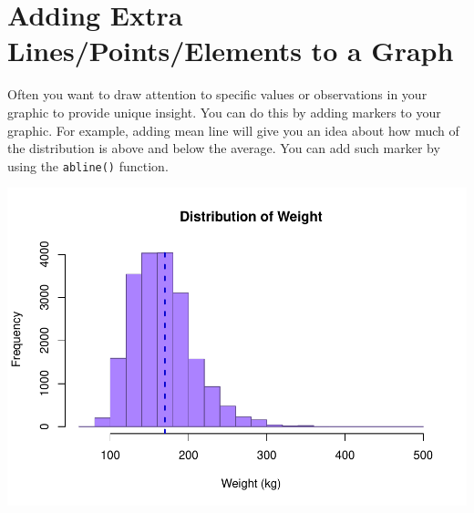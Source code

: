 \documentclass[
]{book}
\newenvironment{Shaded}{\begin{snugshade}}{\end{snugshade}}
\newcommand{\CommentTok}[1]{\textcolor[rgb]{0.56,0.35,0.01}{\textit{#1}}}
\newcommand{\DataTypeTok}[1]{\textcolor[rgb]{0.13,0.29,0.53}{#1}}
\newcommand{\DecValTok}[1]{\textcolor[rgb]{0.00,0.00,0.81}{#1}}
\newcommand{\KeywordTok}[1]{\textcolor[rgb]{0.13,0.29,0.53}{\textbf{#1}}}
\newcommand{\NormalTok}[1]{#1}
\newcommand{\OperatorTok}[1]{\textcolor[rgb]{0.81,0.36,0.00}{\textbf{#1}}}
\newcommand{\StringTok}[1]{\textcolor[rgb]{0.31,0.60,0.02}{#1}}
\begin{document}
\hypertarget{adding-extra-linespointselements-to-a-graph}{%
\section{Adding Extra Lines/Points/Elements to a Graph}\label{adding-extra-linespointselements-to-a-graph}}

Often you want to draw attention to specific values or observations in your graphic to provide unique insight. You can do this by adding markers to your graphic. For example, adding mean line will give you an idea about how much of the distribution is above and below the average. You can add such marker by using the \texttt{abline()} function.

\begin{Shaded}
\end{Shaded}

\includegraphics{_main_files/figure-latex/unnamed-chunk-143-1.pdf}
\end{document}
